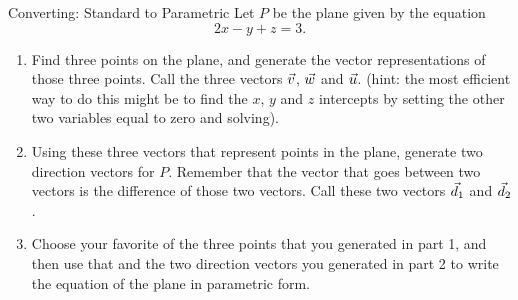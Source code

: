 \begin{exercise}{Converting: Standard to Parametric}
Let $P$ be the plane given by the equation $$2x-y+z=3.$$
\begin{enumerate}
\item Find three points on the plane, and generate the vector representations of those three points. Call the three vectors $\vec{v}$, $\vec{w}$ and $\vec{u}$. (hint: the most efficient way to do this might be to find the $x$, $y$ and $z$ intercepts by setting the other two variables equal to zero and solving).
\vspace{1em}
\item Using these three vectors that represent points in the plane, generate two direction vectors for $P$. Remember that the vector that goes between two vectors is the difference of those two vectors. Call these two vectors $\vec{d}_1$ and $\vec{d}_2$.
\vspace{1em}
\item Choose your favorite of the three points that you generated in part 1, and then use that and the two direction vectors you generated in part 2 to write the equation of the plane in parametric form.
\end{enumerate}
\end{exercise}